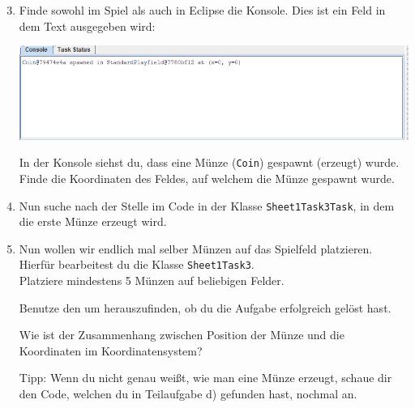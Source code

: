 \begin{enumerate}\setcounter{enumi}{2}

    \item Finde sowohl im Spiel als auch in Eclipse die Konsole. Dies ist ein Feld in dem Text ausgegeben wird:
    \begin{center}
        \includegraphics[width=\linewidth]{./figures/console.PNG}
    \end{center}

    In der Konsole siehst du, dass eine Münze (\texttt{Coin}) gespawnt (erzeugt) wurde.
    Finde die Koordinaten des Feldes, auf welchem die Münze gespawnt wurde.

    \item Nun suche nach der Stelle im Code in der Klasse \lstinline{Sheet1Task3Task}, in dem die erste Münze erzeugt wird.\\

    \item Nun wollen wir endlich mal selber Münzen auf das Spielfeld platzieren.
        Hierfür bearbeitest du die Klasse \lstinline{Sheet1Task3}.\\
        Platziere mindestens 5 Münzen auf beliebigen Felder.

        Benutze den  um herauszufinden, ob du die Aufgabe erfolgreich gelöst hast.

        Wie ist der Zusammenhang zwischen Position der Münze und die Koordinaten im Koordinatensystem?

        Tipp: Wenn du nicht genau weißt, wie man eine Münze erzeugt, schaue dir den Code, welchen du in Teilaufgabe d) gefunden hast, nochmal an.
\end{enumerate}
